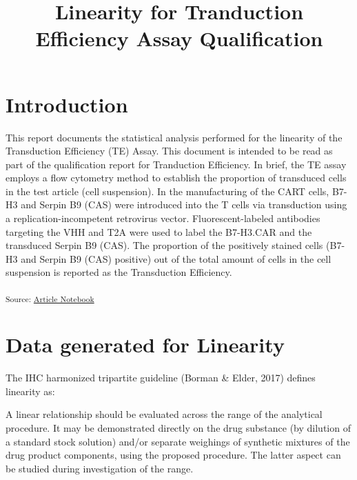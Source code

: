 \documentclass[
]{agujournal2019}
\begin{document}
\title{Linearity for Tranduction Efficiency Assay Qualification}







\section{Introduction}\label{introduction}

This report documents the statistical analysis performed for the
linearity of the Transduction Efficiency (TE) Assay. This document is
intended to be read as part of the qualification report for Tranduction
Efficiency. In brief, the TE assay employs a flow cytometry method to
establish the proportion of transduced cells in the test article (cell
suspension). In the manufacturing of the CART cells, B7-H3 and Serpin B9
(CAS) were introduced into the T cells via transduction using a
replication-incompetent retrovirus vector. Fluorescent-labeled
antibodies targeting the VHH and T2A were used to label the B7-H3.CAR
and the transduced Serpin B9 (CAS). The proportion of the positively
stained cells (B7-H3 and Serpin B9 (CAS) positive) out of the total
amount of cells in the cell suspension is reported as the Transduction
Efficiency.

\textsubscript{Source:
\href{https://jinkaiteo.github.io/quarto-template/index.qmd.html}{Article
Notebook}}

\section{Data generated for
Linearity}\label{data-generated-for-linearity}

The IHC harmonized tripartite guideline (Borman \& Elder, 2017) defines
linearity as:

\begin{tcolorbox}[enhanced jigsaw, coltitle=black, breakable, opacitybacktitle=0.6, colbacktitle=quarto-callout-note-color!10!white, toprule=.15mm, opacityback=0, bottomtitle=1mm, titlerule=0mm, colframe=quarto-callout-note-color-frame, leftrule=.75mm, title=\textcolor{quarto-callout-note-color}{\faInfo}\hspace{0.5em}{IHC Guidlines}, toptitle=1mm, colback=white, arc=.35mm, rightrule=.15mm, bottomrule=.15mm, left=2mm]

A linear relationship should be evaluated across the range of the
analytical procedure. It may be demonstrated directly on the drug
substance (by dilution of a standard stock solution) and/or separate
weighings of synthetic mixtures of the drug product components, using
the proposed procedure. The latter aspect can be studied during
investigation of the range.

\end{tcolorbox}
\end{document}
